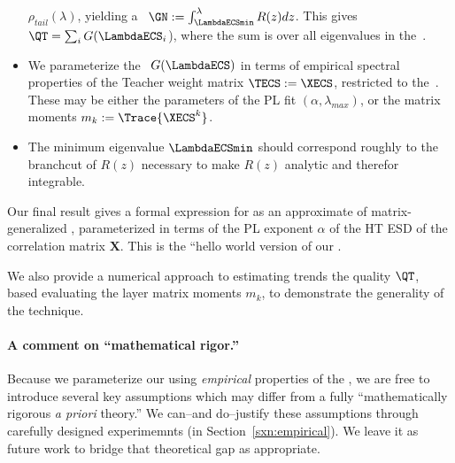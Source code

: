 \begin{itemize}
       $\rho_{tail}(\lambda)$, yielding a \GEN~$\GN:=\int^{\lambda}_{\LambdaECSmin}R(z)dz$.
  This gives $\QT=\sum_{i}G(\LambdaECS_{i}$), where the sum is over all eigenvalues in the~\ECS.
     \item  We parameterize the \GEN~$G(\LambdaECS)$ in terms of empirical spectral properties
       of the Teacher weight matrix $\TECS:=\XECS$, restricted to the~\ECS.
       These may be either the parameters of the PL fit $(\alpha, \lambda_{max})$, or the matrix moments $m_{k}:=\Trace{\XECS^{k}}$.
       \item The \ECS minimum eigenvalue $\LambdaECSmin$ should correspond roughly to the branchcut of $R(z)$ necessary to make $R(z)$ analytic
  and therefor integrable.

\end{itemize}

Our final result gives a formal expression for \ALPHAHAT as an approximate \Annealed \FreeEnergy of matrix-generalized \LinearPerceptron,
parameterized in terms of the PL exponent $\alpha$ of the HT ESD of the \Teacher correlation matrix $\mathbf{X}$.
This is the ``hello world version of our \SETOL.

We also provide a numerical approach to estimating trends the quality $\QT$, based evaluating the layer matrix moments $m_{k}$,
to demonstrate the generality of the technique.


\paragraph{A comment on ``mathematical rigor.''}
Because we parameterize our \SETOL using \emph{empirical} properties of the \Teacher, we are free to introduce several key assumptions which may differ from a fully ``mathematically rigorous \emph{a priori} theory.''
We can--and do--justify these assumptions through carefully designed experimemnts (in Section~\ref{sxn:empirical}).
We leave it as future work to bridge that theoretical gap as appropriate.


